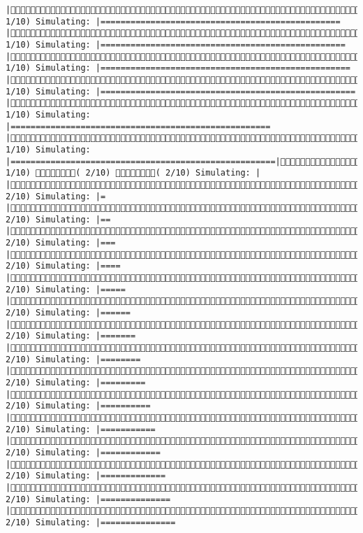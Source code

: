 \documentclass[]{article}
\begin{document}
\begin{verbatim}
|( 1/10) Simulating: |================================================     |( 1/10) Simulating: |=================================================    |( 1/10) Simulating: |==================================================   |( 1/10) Simulating: |===================================================  |( 1/10) Simulating: |==================================================== |( 1/10) Simulating: |=====================================================|( 1/10) ( 2/10) ( 2/10) Simulating: |                                                     |( 2/10) Simulating: |=                                                    |( 2/10) Simulating: |==                                                   |( 2/10) Simulating: |===                                                  |( 2/10) Simulating: |====                                                 |( 2/10) Simulating: |=====                                                |( 2/10) Simulating: |======                                               |( 2/10) Simulating: |=======                                              |( 2/10) Simulating: |========                                             |( 2/10) Simulating: |=========                                            |( 2/10) Simulating: |==========                                           |( 2/10) Simulating: |===========                                          |( 2/10) Simulating: |============                                         |( 2/10) Simulating: |=============                                        |( 2/10) Simulating: |==============                                       |( 2/10) Simulating: |===============                         
\end{verbatim}
\end{document}
